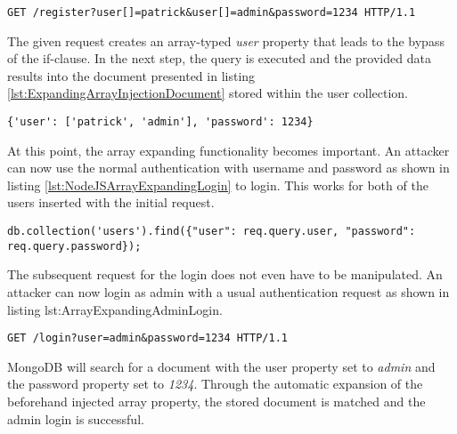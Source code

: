 \begin{lstlisting}[caption={Attack vector against MongoDB for expanding array injection via the query-string parameter}, label={lst:ExpandingArrayInjection}]
GET /register?user[]=patrick&user[]=admin&password=1234 HTTP/1.1
\end{lstlisting}

The given request creates an array-typed \emph{user} property that leads to the bypass of the if-clause. In the next step, the query is executed and the provided data results into the document presented in listing \ref{lst:ExpandingArrayInjectionDocument} stored within the user collection.\\

\begin{lstlisting}[caption={Resulting parameter for expanding array injection}, label={lst:ExpandingArrayInjectionDocument}]
{'user': ['patrick', 'admin'], 'password': 1234}
\end{lstlisting}

At this point, the array expanding functionality becomes important. An attacker can now use the normal authentication with username and password as shown in listing \ref{lst:NodeJSArrayExpandingLogin} to login. This works for both of the users inserted with the initial request. \\

\begin{lstlisting}[caption={Login example affected by the preceding expanding array injection}, label={lst:NodeJSArrayExpandingLogin}]
db.collection('users').find({"user": req.query.user, "password": req.query.password});
\end{lstlisting}

The subsequent request for the login does not even have to be manipulated. An attacker can now login as admin with a usual authentication request as shown in listing {lst:ArrayExpandingAdminLogin}.\\

\begin{lstlisting}[caption={Usual login request exploiting the injected user array}, label={lst:ArrayExpandingAdminLogin}]
GET /login?user=admin&password=1234 HTTP/1.1
\end{lstlisting}

MongoDB will search for a document with the user property set to \emph{admin} and the password property set to \emph{1234}. Through the automatic expansion of the beforehand injected array property, the stored document is matched and the admin login is successful.\\

